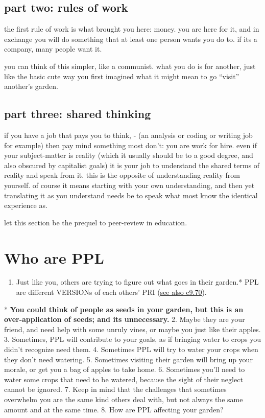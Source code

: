 \documentclass[
]{book}
\providecommand{\tightlist}{%
  \setlength{\itemsep}{0pt}\setlength{\parskip}{0pt}}
\begin{document}
\hypertarget{part-two-rules-of-work}{%
\subsection{part two: rules of work}\label{part-two-rules-of-work}}

the first rule of work
is what brought you here:
money.
you are here for it,
and in exchange you will
do something that at least one person
wants you do to.
if its a company, many people want it.

you can think of this simpler,
like a communist.
what you do is for another,
just like the basic cute way
you first imagined what it might mean
to go ``visit'' another's garden.

\hypertarget{part-three-shared-thinking}{%
\subsection{part three: shared thinking}\label{part-three-shared-thinking}}

if you have a job
that pays you to think,
- (an analysis or coding or writing job for example)
then pay mind something most don't:
you are work for hire.
even if your subject-matter is reality
(which it usually should be to a good degree,
and also obscured by capitalist goals)
it is your job to
understand the shared terms of reality
and speak from it.
this is the opposite of
understanding reality from yourself.
of course it means starting
with your own understanding,
and then yet translating it
as you understand needs be
to speak what most know
the identical experience as.

let this section be the prequel
to peer-review
in education.

\hypertarget{who-are-ppl}{%
\section{Who are PPL}\label{who-are-ppl}}

\begin{enumerate}
\def\labelenumi{\arabic{enumi}.}
\tightlist
\item
  Just like you, others are trying to figure out what goes in their garden.* PPL are different VERSIONs of each others' PRI (\protect\hyperlink{norms-style}{see also c9.70}).
\end{enumerate}

* \textbf{You could think of people as seeds in your garden, but this is an over-application of seeds; and its unnecessary.}
2. Maybe they are your friend, and need help with some unruly vines, or
maybe you just like their apples.
3. Sometimes, PPL will contribute to your goals, as if bringing water to crops you didn't recognize need them. 4. Sometimes PPL will try to water your crops when they don't need watering.
5. Sometimes visiting their garden will bring up your morale, or get you a bag of apples to take home.
6. Sometimes you'll need to water some crops that need to be watered, because the sight of their neglect cannot be ignored.
7. Keep in mind that the challenges that sometimes overwhelm you are the same kind others deal with, but not always the same amount and at the same time.
8. How are PPL affecting your garden?
\end{document}
